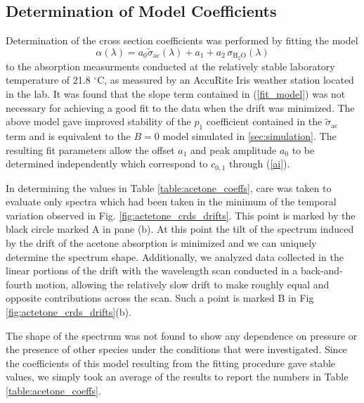 \documentclass[8pt,a4paper]{report}
\begin{document}
	
	\subsection{Determination of Model Coefficients} \label{sec:coeffs_acetone}
	
	Determination of the cross section coefficients was performed by fitting the model
	\begin{equation} \label{fit_model_coeff}
		\alpha(\lambda) = a_0\tilde{\sigma}_{\mathrm{ac}}(\lambda) + a_1 + a_2\,\sigma_\mathrm{H_2O}(\lambda)
	\end{equation}
	to the absorption measurments conducted at the relatively stable laboratory temperature of 21.8 $^\circ$C, as measured by an AccuRite Iris weather station located in the lab. It was found that the slope term contained in (\ref{fit_model}) was not necessary for achieving a good fit to the data when the drift was minimized. The above model gave improved stability of the $p_1$ coefficient contained in the $\tilde{\sigma}_{\mathrm{ac}}$ term and is equivalent to the $B=0$ model simulated in \ref{sec:simulation}. The resulting fit parameters allow the offset $a_1$ and peak amplitude $a_0$ to be determined independently which correspond to $c_{0,1}$ through (\ref{ai}).
	
	In determining the values in Table \ref{table:acetone_coeffs}, care was taken to evaluate only spectra which had been taken in the minimum of the temporal variation observed in Fig. \ref{fig:actetone_crds_drifts}. This point is marked by the black circle marked A in pane (b). At this point the tilt of the spectrum induced by the drift of the acetone absorption is minimized and we can uniquely determine the spectrum shape. Additionally, we analyzed data collected in the linear portions of the drift with the wavelength scan conducted in a back-and-fourth motion, allowing the relatively slow drift to make roughly equal and opposite contributions across the scan. Such a point is marked B in Fig \ref{fig:actetone_crds_drifts}(b).
	
	The shape of the spectrum was not found to show any dependence on pressure or the presence of other species under the conditions that were investigated. Since the coefficients of this model resulting from the fitting procedure gave stable values, we simply took an average of the results to report the numbers in Table \ref{table:acetone_coeffs}.
	
\end{document}
